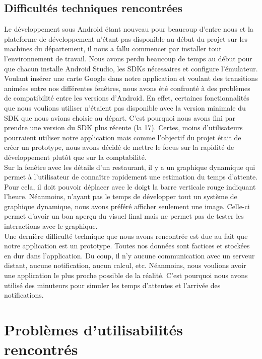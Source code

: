 \subsection{Difficultés techniques rencontrées}
Le développement sous Android étant nouveau pour beaucoup d'entre nous et la
plateforme de développement n'étant pas disponible au début du projet sur les
machines du département, il nous a fallu commencer par installer tout
l'environnement de travail. Nous avons perdu beaucoup de temps au début
pour que chacun installe Android Studio, les SDKs nécessaires et configure
l'émulateur. \\

Voulant insérer une carte Google dans notre application et voulant des
transitions animées entre nos différentes fenêtres, nous avons été confronté
à des problèmes de compatibilité entre les versions d'Android. En effet, 
certaines fonctionnalités que nous voulions utiliser n'étaient pas disponible
avec la version minimale du SDK que nous avions choisie au départ. C'est pourquoi
nous avons fini par prendre une version du SDK plus récente (la 17). Certes,
moins d'utilisateurs pourraient utiliser notre application mais comme l'objectif
du projet était de créer un prototype, nous avons décidé de mettre le focus sur 
la rapidité de développement plutôt que sur la comptabilité. \\

Sur la fenêtre avec les détails d'un restaurant, il y a un graphique dynamique
qui permet à l'utilisateur de connaître rapidement une estimation du temps
d'attente. Pour cela, il doit pouvoir déplacer avec le doigt
la barre verticale rouge indiquant l'heure. Néanmoins, n'ayant
pas le temps de développer tout un système de graphique dynamique, nous avons
préféré afficher seulement une image. Celle-ci permet d'avoir un bon aperçu du
visuel final mais ne permet pas de tester les interactions avec le graphique.\\

Une dernière difficulté technique que nous avons rencontrée est due au fait que
notre application est un prototype. Toutes nos données sont factices et stockées
en dur dans l'application. Du coup, il n'y aucune communication avec un serveur
distant, aucune notification, aucun calcul, etc. Néanmoins, nous voulions avoir
une application le plus proche possible de la réalité. C'est pourquoi nous avons
utilisé des minuteurs pour simuler les temps d'attentes et l'arrivée des 
notifications. 

\section{Problèmes d'utilisabilités rencontrés}

